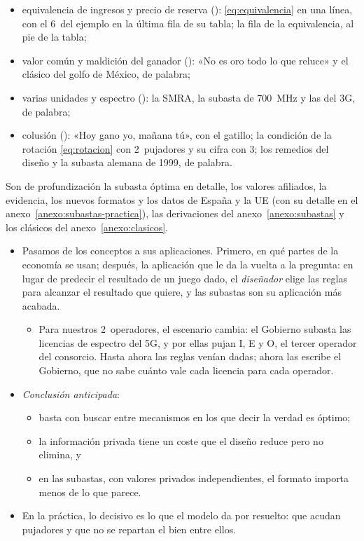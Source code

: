 \documentclass[11pt]{article}
\begin{document}
\begin{notaopositor}
\begin{itemize}
\begin{itemize}
  \item equivalencia de ingresos y precio de reserva (): \eqref{eq:equivalencia} en una línea, con el 6~del ejemplo en la última fila de su tabla; la fila de la equivalencia, al pie de la tabla;
  \item valor común y maldición del ganador (): «No es oro todo lo que reluce» y el clásico del golfo de México, de palabra;
  \item varias unidades y espectro (): la SMRA, la subasta de 700~MHz y las del 3G, de palabra;
  \item colusión (): «Hoy gano yo, mañana tú», con el gatillo; la condición de la rotación \eqref{eq:rotacion} con 2~pujadores y su cifra con 3; los remedios del diseño y la subasta alemana de 1999, de palabra.
  \end{itemize}
\end{itemize}
Son de profundización la subasta óptima en detalle, los valores afiliados, la evidencia, los nuevos formatos y los datos de España y la UE (con su detalle en el anexo~\ref{anexo:subastas-practica}), las derivaciones del anexo~\ref{anexo:subastas} y los clásicos del anexo~\ref{anexo:clasicos}.
\end{notaopositor}

\begin{itemize}
\item Pasamos de los conceptos a sus aplicaciones. Primero, en qué partes de la economía se usan; después, la aplicación que le da la vuelta a la pregunta: en lugar de predecir el resultado de un juego dado, el \emph{diseñador} elige las reglas para alcanzar el resultado que quiere, y las subastas son su aplicación más acabada.
  \begin{itemize}
  \item Para nuestros 2~operadores, el escenario cambia: el Gobierno subasta las licencias de espectro del 5G, y por ellas pujan \textup{I}, E y O, el tercer operador del consorcio. Hasta ahora las reglas venían dadas; ahora las escribe el Gobierno, que no sabe cuánto vale cada licencia para cada operador.
  \end{itemize}
\item \emph{Conclusión anticipada}:
  \begin{itemize}
  \item basta con buscar entre mecanismos en los que decir la verdad es óptimo;
  \item la información privada tiene un coste que el diseño reduce pero no elimina, y
  \item en las subastas, con valores privados independientes, el formato importa menos de lo que parece.
  \end{itemize}
\item En la práctica, lo decisivo es lo que el modelo da por resuelto: que acudan pujadores y que no se repartan el bien entre ellos.
\end{itemize}
\end{document}
